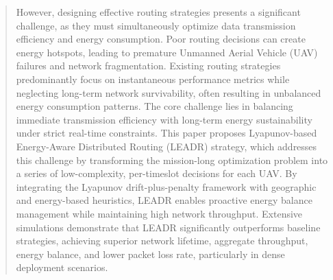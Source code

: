 \documentclass[runningheads]{llncs}
\begin{document}
\begin{abstract}
However, designing effective routing strategies presents a significant challenge, as they must simultaneously optimize data transmission efficiency and energy consumption. Poor routing decisions can create energy hotspots, leading to premature Unmanned Aerial Vehicle (UAV) failures and network fragmentation.
Existing routing strategies predominantly focus on instantaneous performance metrics while neglecting long-term network survivability, often resulting in unbalanced energy consumption patterns.
The core challenge lies in balancing immediate transmission efficiency with long-term energy sustainability under strict real-time constraints.
This paper proposes Lyapunov-based Energy-Aware Distributed Routing (LEADR) strategy, which addresses this challenge by transforming the mission-long optimization problem into a series of low-complexity, per-timeslot decisions for each UAV. By integrating the Lyapunov drift-plus-penalty framework with geographic and energy-based heuristics, LEADR enables proactive energy balance management while maintaining high network throughput. Extensive simulations demonstrate that LEADR significantly outperforms baseline strategies, achieving superior network lifetime, aggregate throughput, energy balance, and lower packet loss rate, particularly in dense deployment scenarios.

\end{abstract}
%
\end{document}
